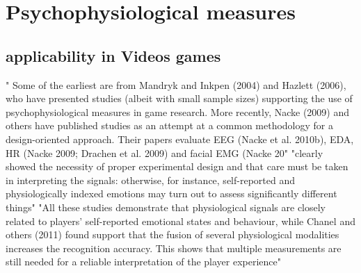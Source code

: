 \section{Psychophysiological measures}

\subsection{applicability in Videos games}
" Some of the earliest are from Mandryk and
Inkpen (2004) and Hazlett (2006), who have presented studies (albeit with
small sample sizes) supporting the use of psychophysiological measures in game research. More recently, Nacke (2009) and others have published studies as an attempt at a common methodology for a design-oriented approach. Their papers evaluate EEG (Nacke et al. 2010b), EDA, HR (Nacke 2009; Drachen et al. 2009) and facial EMG (Nacke 20" \cite{kivikangas2011review}
"clearly showed the necessity of proper experimental design and that care must be taken in interpreting the signals: otherwise, for instance, self-reported and physiologically indexed emotions may turn out to assess significantly different things"  \cite{kivikangas2011review}
"All these studies demonstrate that physiological signals are closely related to players’ self-reported emotional states and behaviour, while Chanel and others (2011) found support that the fusion of several physiological modalities increases the recognition accuracy. This shows that multiple measurements are still needed for a reliable interpretation of the player experience"  \cite{kivikangas2011review}








